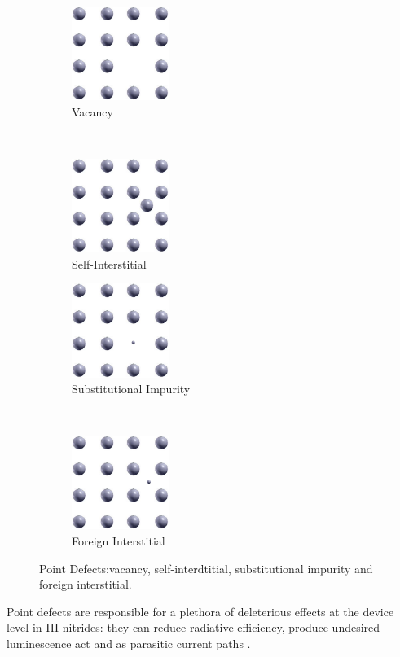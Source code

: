 \begin{figure}[t!]
	\centering
	\begin{subfigure}[t]{0.3\textwidth}
		\centering
		\includegraphics[height=1.2in]{Figs/Ch1/vacancy.png}
		\caption{Vacancy}
		\vspace*{1cm}
	\end{subfigure}%
	~ 
	\begin{subfigure}[t]{0.3\textwidth}
		\centering
		\includegraphics[height=1.2in]{Figs/Ch1/self-inter.png}
		\caption{Self-Interstitial}
	\end{subfigure}
	
	\begin{subfigure}[b]{0.3\textwidth}
		\centering
		\includegraphics[height=1.2in]{Figs/Ch1/sub-impure.png}
		\caption{Substitutional Impurity}
	\end{subfigure}%
	~ 
	\begin{subfigure}[b]{0.3\textwidth}
		\centering
		\includegraphics[height=1.2in]{Figs/Ch1/foreign.png}
		\caption{Foreign Interstitial}
	\end{subfigure}
	\caption{Point Defects:vacancy, self-interdtitial, substitutional impurity and foreign interstitial.}
	\label{1.6}
\end{figure}
\FloatBarrier
 Point defects are responsible for a plethora of deleterious effects at the device level in III-nitrides: they can reduce radiative efficiency, produce undesired luminescence act and as parasitic current paths \cite{Reshchikov2005}.
